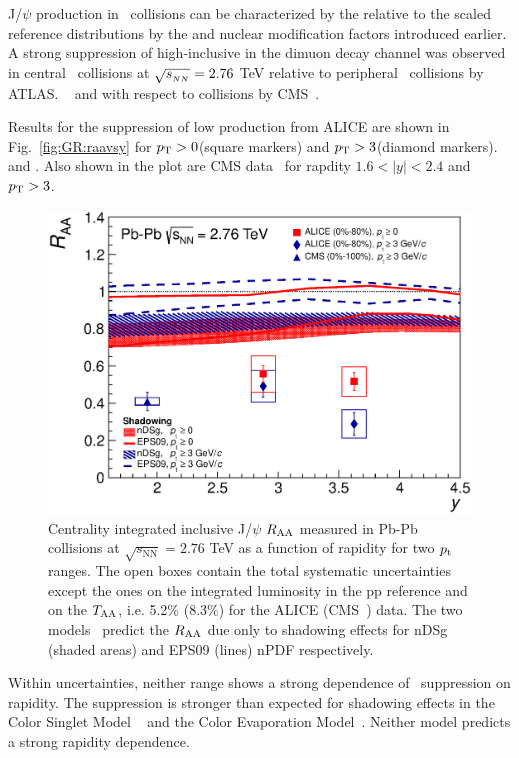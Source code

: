 J/$\psi$ production in \PbPb\ collisions can be characterized by the relative to the \Ncoll scaled reference 
distributions by the \Rcp and \Raa nuclear modification factors introduced earlier.
A strong suppression of high-\pt inclusive \jpsi in the dimuon decay channel was observed in central \PbPb\ collisions
at $\sqrt{s_{_{NN}}} = 2.76$ TeV  relative to peripheral \PbPb\ collisions by ATLAS.
~\cite{Atlas:2010px} and with respect to \pp collisions by CMS~\cite{Chatrchyan:2012np}.

Results for the suppression of low \pt \jpsi production from ALICE are shown 
in Fig.~\ref{fig:GR:raavsy} for $p_{\rm{T}} > 0$\GeVc (square markers) and 
$p_{\rm{T}} > 3$\GeVc (diamond markers). and . Also shown in the plot are CMS data~\cite{Chatrchyan:2012np} 
for rapdity $ 1.6 < |y| < 2.4 $ and $p_{\rm{T}} > 3$\GeVc. 

\begin{figure}
\begin{center}
\includegraphics[width=0.49\linewidth]{qqbarfigures/RAAvsY_v7.eps}
\caption{ \label{fig:raavsy}  Centrality integrated inclusive J/$\psi$ $R_{\rm{AA}}$ measured in Pb-Pb
collisions at $\sqrt{s_{\mathrm{NN}}} = 2.76$ TeV as a function of  rapidity  for two $p_{\rm{t}}$ ranges.
The open boxes contain the total systematic uncertainties except the ones on the integrated luminosity in the pp reference
 and on the $T_{\rm{AA}}$, i.e.  5.2\% (8.3\%) for the  ALICE (CMS~\cite{Chatrchyan:2012np}) data.
The two models~\cite{Ferreiro:2011rw,Vogt:2010aa} predict the  $R_{\rm{AA}}$  due  only to shadowing effects
for  nDSg (shaded areas) and EPS09 (lines) nPDF respectively.}
\end{center}
\end{figure}

Within uncertainties, neither \pt range shows a strong dependence of \jpsi\ suppression on rapidity. 
The suppression is stronger than expected for shadowing effects in the Color Singlet Model
~\cite{Ferreiro:2011rw} and the Color Evaporation Model~\cite{Vogt:2010aa}. Neither model
predicts a strong rapidity dependence.

